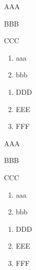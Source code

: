 ﻿\documentclass{article}
\begin{document}
\dotfill

    \begin{enumerate}[label={[\Alph*]},labelindent=\parindent,leftmargin=*]
        \item AAA
        \item BBB
        \item CCC
    \end{enumerate}

    \begin{enumerate}
        \item aaa
        \item bbb
    \end{enumerate}

    \begin{enumerate}[resume]
        \item DDD
        \item EEE
        \item FFF
    \end{enumerate}

    \begin{enumerate}[label={[\Alph*]},labelindent=\parindent,leftmargin=*,series=mylist] %
        \item AAA
        \item BBB
        \item CCC
    \end{enumerate}

    \begin{enumerate}
        \item aaa
        \item bbb
    \end{enumerate}

    \begin{enumerate}[resume=mylist] %
        \item DDD
        \item EEE
        \item FFF
    \end{enumerate}
\end{document}
